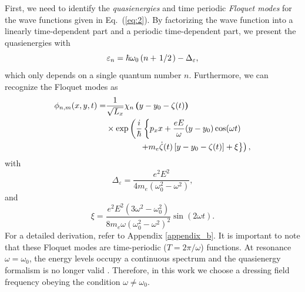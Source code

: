 \documentclass[
 reprint,
 amsmath,amssymb,
 aps,
 prb,
]{revtex4-2}
\begin{document}
First, we need to identify the \textit{quasienergies} and time periodic \textit{Floquet modes} \cite{grifoni98} for the wave functions given in Eq.~(\ref{eq:2}). By factorizing the wave function into a linearly time-dependent part and a periodic time-dependent part, we present the quasienergies with
\begin{equation} \label{eq:6}
  \varepsilon_{n} =
  \hbar \omega_0 \left(n + \flatfrac{1}{2}\right) - \Delta_{\varepsilon},
\end{equation}
which only depends on a single quantum number $n$. Furthermore, we can recognize the Floquet modes as
\begin{equation} \label{eq:7}
  \begin{aligned}
    \phi_{n,m}(x,y,t) =&
    \frac{1}{\sqrt{L_x}} \chi_{n}\bm{\left(}y - y_0 -\zeta(t)\bm{\right)} \\
    & \times
      \exp \bm{\left(}
      \frac{i}{\hbar}\left\{
      p_x x + \frac{eE}{\omega}(y - y_0)\cos(\omega t) \right.\right. \\
    & \left.\left. \qquad\qquad +
      m_e\dot{\zeta}(t)\left[y - y_0 -\zeta(t)\right] +
      \xi \right\}\bm{\right)},
  \end{aligned}
\end{equation}
with
\begin{equation} \label{eq:8}
  \Delta_{\varepsilon} = \frac{e^2E^2}{4m_e(\omega_0^2 - \omega^2)},
\end{equation}
and
\begin{equation} \label{eq:9}
  \xi = \frac{e^2E^2 \left(3\omega^2 - \omega_0^2 \right)}
  {8m_e\omega(\omega_0^2 - \omega^2)^2} \sin(2\omega t).
\end{equation}
For a detailed derivation, refer to Appendix \ref{appendix_b}.
It is important to note that these Floquet modes are time-periodic ($T=2\pi/\omega$) functions. At resonance $\omega = \omega_0$, the energy levels occupy a continuous spectrum and the quasienergy formalism is no longer valid \cite{popov70}. Therefore, in this work we choose a dressing field frequency obeying the condition $\omega \neq \omega_0$.
\end{document}
